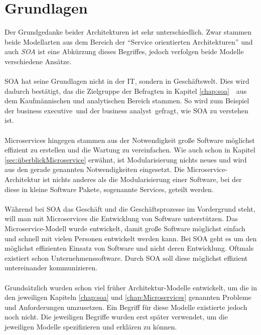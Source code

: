 \section{Grundlagen}
\label{sec:FazitGrundlagen}
Der Grundgedanke beider Architekturen ist sehr unterschiedlich. Zwar stammen beide Modellarten aus dem Bereich der "`Service orientierten Architekturen"' und auch \textit{SOA} ist eine Abkürzung dieses Begriffes, jedoch verfolgen beide Modelle verschiedene Ansätze.  
\\\\
SOA hat seine Grundlagen nicht in der IT, sondern in Geschäftswelt. Dies wird dadurch bestätigt, das die Zielgruppe der Befragten in Kapitel \ref{chap:soa}\ \ aus dem Kaufmännischen und analytischen Bereich stammen. So wird zum Beispiel der \flqq business executive\frqq\ und der \flqq business analyst\frqq\ gefragt, wie SOA zu verstehen ist.
\\\\
Microservices hingegen stammen aus der Notwendigkeit große Software möglichst effizient zu erstellen und die Wartung zu vereinfachen. Wie auch schon in Kapitel \ref{sec:überblickMicroservice}  erwähnt, ist Modularisierung nichts neues und wird aus den gerade genannten Notwendigkeiten eingesetzt. Die Microservice-Architektur ist nichts anderes als die Modularisierung einer Software, bei der diese in kleine Software Pakete, sogenannte Services, geteilt werden.
\\\\
Während bei SOA das Geschäft und die Geschäftsprozesse im Vordergrund steht, will man mit Microservices die Entwicklung von Software unterstützen. Das Microservice-Modell wurde entwickelt, damit große Software möglichst einfach und schnell mit vielen Personen entwickelt werden kann. Bei SOA geht es um den möglichst effizienten Einsatz von Software und nicht deren Entwicklung. Oftmals existiert schon Unternehmenssoftware. Durch SOA soll diese möglichst effizient untereinander kommunizieren.
\\\\
Grundsätzlich wurden schon viel früher Architektur-Modelle entwickelt, um die in den jeweiligen Kapiteln \ref{chap:soa}  und \ref{chap:Microservices}  genannten Probleme und Anforderungen umzusetzen. Ein Begriff für diese Modelle existierte jedoch noch nicht. Die jeweiligen Begriffe wurden erst später verwendet, um die jeweiligen Modelle spezifizieren und erklären zu können.

